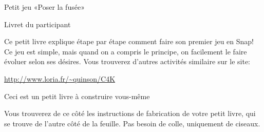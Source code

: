 \documentclass[a4paper,12pt]{article}
\begin{document}
\begin{center}
  {\Huge Petit jeu «Poser la fusée»}

  \bigskip
  {\Large Livret du participant}
  \vspace{-\baselineskip}
\end{center}

\large

Ce petit livre explique étape par étape comment faire son premier jeu en Snap!
Ce jeu est simple, mais quand on a compris le principe, on facilement le faire
évoluer selon ses désires. Vous trouverez d'autres activités similaire sur le
site:

\centerline{\color{blue}\url{http://www.loria.fr/~quinson/C4K}}

\bigskip\bigskip
\bigskip\bigskip

\centerline{\Large Ceci est un petit livre à construire vous-même}


Vous trouverez de ce côté les instructions de fabrication de votre
petit livre, qui se trouve de l'autre côté de la feuille. Pas besoin
de colle, uniquement de ciseaux.

\bigskip\bigskip
\end{document}
